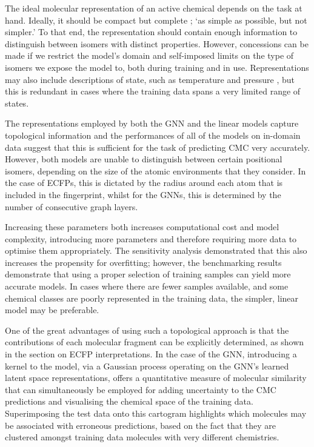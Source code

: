 The ideal molecular representation of an active chemical depends on the task at
hand. Ideally, it should be compact but complete
\cite{faberCrystalStructureRepresentations2015,himanenDScribeLibraryDescriptors2020};
`as simple as possible, but not simpler.' To that end, the representation should
contain enough information to distinguish between isomers with distinct
properties. However, concessions can be made if we restrict the model's domain
and self-imposed limits on the type of isomers we expose the model to, both
during training and in use. Representations may also include descriptions of
state, such as temperature and pressure \cite{chenGraphNetworksUniversal2019},
but this is redundant in cases where the training data spans a very limited
range of states.

The representations employed by both the GNN and the linear models capture
topological information and the performances of all of the models on in-domain
data suggest that this is sufficient for the task of predicting CMC very
accurately. However, both models are unable to distinguish between certain
positional isomers, depending on the size of the atomic environments that they
consider. In the case of ECFPs, this is dictated by the radius around each atom
that is included in the fingerprint, whilst for the GNNs, this is determined by
the number of consecutive graph layers.

Increasing these parameters both increases computational cost and model
complexity, introducing more parameters and therefore requiring more data to
optimise them appropriately. The sensitivity analysis demonstrated that this
also increases the propensity for overfitting; however, the benchmarking results
demonstrate that using a proper selection of training samples can yield more
accurate models. In cases where there are fewer samples available, and some
chemical classes are poorly represented in the training data, the simpler,
linear model may be preferable.

One of the great advantages of using such a topological approach is that the
contributions of each molecular fragment can be explicitly determined, as shown
in the section on ECFP interpretations. In the case of the GNN, introducing a
kernel to the model, via a Gaussian process operating on the GNN's learned
latent space representations, offers a quantitative measure of molecular
similarity that can simultaneously be employed for adding uncertainty to the CMC
predictions and visualising the chemical space of the training data.
Superimposing the test data onto this cartogram highlights which molecules may
be associated with erroneous predictions, based on the fact that they are
clustered amongst training data molecules with very different chemistries.

